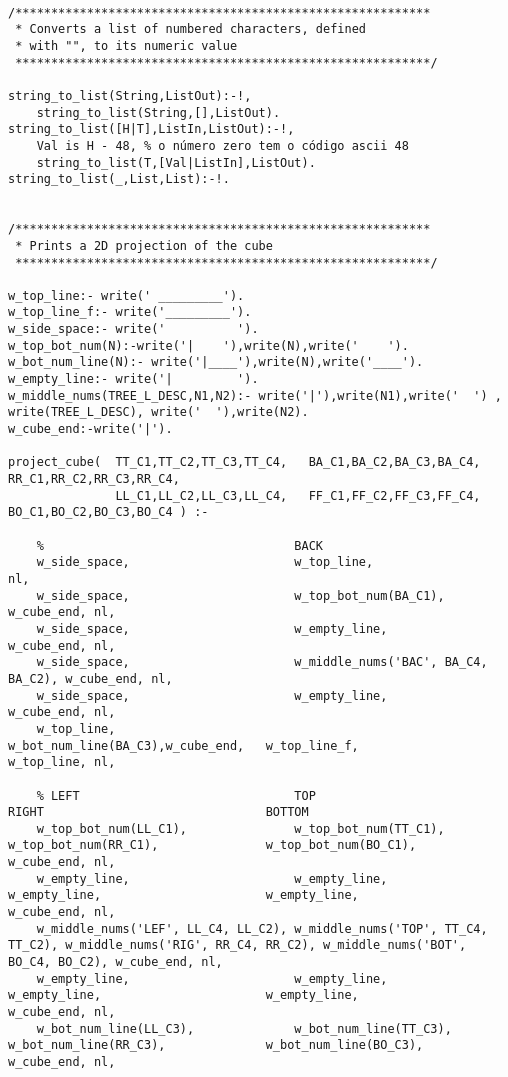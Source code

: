 \begin{lstlisting}
	
/**********************************************************
 * Converts a list of numbered characters, defined
 * with "", to its numeric value
 **********************************************************/
 
string_to_list(String,ListOut):-!,
	string_to_list(String,[],ListOut).
string_to_list([H|T],ListIn,ListOut):-!,
	Val is H - 48, % o número zero tem o código ascii 48
	string_to_list(T,[Val|ListIn],ListOut).
string_to_list(_,List,List):-!.


/**********************************************************
 * Prints a 2D projection of the cube
 **********************************************************/

w_top_line:- write(' _________').
w_top_line_f:- write('_________').
w_side_space:- write('          ').
w_top_bot_num(N):-write('|    '),write(N),write('    ').
w_bot_num_line(N):- write('|____'),write(N),write('____').
w_empty_line:- write('|         ').
w_middle_nums(TREE_L_DESC,N1,N2):- write('|'),write(N1),write('  ') , write(TREE_L_DESC), write('  '),write(N2).
w_cube_end:-write('|').

project_cube(  TT_C1,TT_C2,TT_C3,TT_C4,   BA_C1,BA_C2,BA_C3,BA_C4,   RR_C1,RR_C2,RR_C3,RR_C4,
               LL_C1,LL_C2,LL_C3,LL_C4,   FF_C1,FF_C2,FF_C3,FF_C4,   BO_C1,BO_C2,BO_C3,BO_C4 ) :-
	
	%                                   BACK
	w_side_space,                       w_top_line,                         nl,
	w_side_space,                       w_top_bot_num(BA_C1),               w_cube_end, nl,
	w_side_space,                       w_empty_line,                       w_cube_end, nl,
	w_side_space,                       w_middle_nums('BAC', BA_C4, BA_C2), w_cube_end, nl,
	w_side_space,                       w_empty_line,                       w_cube_end, nl,
	w_top_line,                         w_bot_num_line(BA_C3),w_cube_end,   w_top_line_f,                      w_top_line, nl,
	
	% LEFT                              TOP                                 RIGHT                               BOTTOM
	w_top_bot_num(LL_C1),               w_top_bot_num(TT_C1),               w_top_bot_num(RR_C1),               w_top_bot_num(BO_C1),               w_cube_end, nl,
	w_empty_line,                       w_empty_line,                       w_empty_line,                       w_empty_line,                       w_cube_end, nl,
	w_middle_nums('LEF', LL_C4, LL_C2), w_middle_nums('TOP', TT_C4, TT_C2), w_middle_nums('RIG', RR_C4, RR_C2), w_middle_nums('BOT', BO_C4, BO_C2), w_cube_end, nl,
	w_empty_line,                       w_empty_line,                       w_empty_line,                       w_empty_line,                       w_cube_end, nl,
	w_bot_num_line(LL_C3),              w_bot_num_line(TT_C3),              w_bot_num_line(RR_C3),              w_bot_num_line(BO_C3),              w_cube_end, nl,
	

\end{lstlisting}
